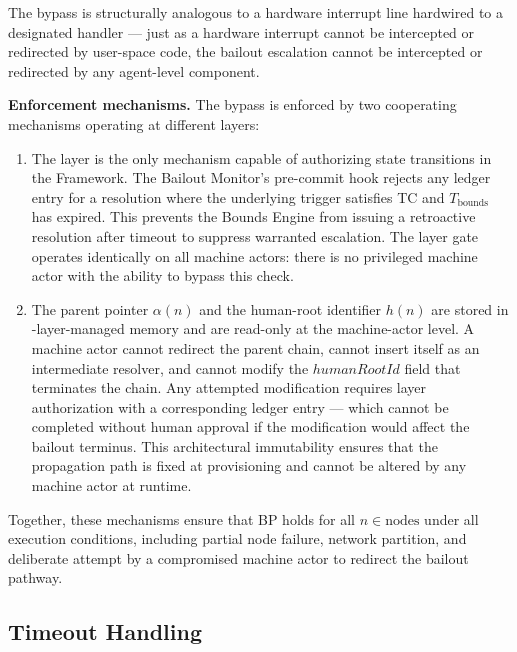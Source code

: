 The bypass is structurally analogous to a hardware interrupt line hardwired to a designated handler --- just as a hardware interrupt cannot be intercepted or redirected by user-space code, the bailout escalation cannot be intercepted or redirected by any agent-level component.

\bigskip
\noindent\textbf{Enforcement mechanisms.} The bypass is enforced by two cooperating mechanisms operating at different layers:

\begin{enumerate}
\item[\textbf{\fact{} Layer gate (enforcement at the authorization layer).}] The \fact{} layer is the only mechanism capable of authorizing state transitions in the \bxthree{} Framework. The Bailout Monitor's pre-commit hook rejects any ledger entry for a resolution where the underlying trigger satisfies TC and $T_{\text{bounds}}$ has expired. This prevents the Bounds Engine from issuing a retroactive resolution after timeout to suppress warranted escalation. The \fact{} layer gate operates identically on all machine actors: there is no privileged machine actor with the ability to bypass this check.

\item[\textbf{Immutable parent-pointer and human-root architecture (enforcement at the data model layer).}] The parent pointer $\alpha(n)$ and the human-root identifier $h(n)$ are stored in \fact-layer-managed memory and are read-only at the machine-actor level. A machine actor cannot redirect the parent chain, cannot insert itself as an intermediate resolver, and cannot modify the $humanRootId$ field that terminates the chain. Any attempted modification requires \purpose{} layer authorization with a corresponding ledger entry --- which cannot be completed without human approval if the modification would affect the bailout terminus. This architectural immutability ensures that the propagation path is fixed at provisioning and cannot be altered by any machine actor at runtime.
\end{enumerate}

Together, these mechanisms ensure that BP holds for all $n \in \text{nodes}$ under all execution conditions, including partial node failure, network partition, and deliberate attempt by a compromised machine actor to redirect the bailout pathway.

\subsection{Timeout Handling}\label{sec:timeout-handling}

